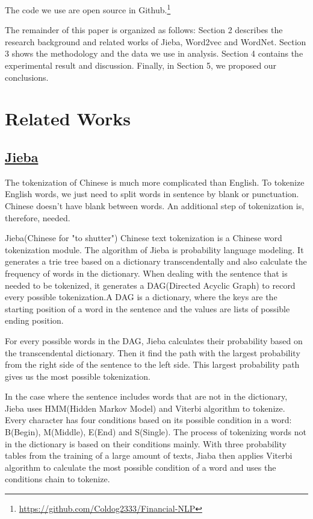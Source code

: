 \documentclass[10pt, conference, compsocconf]{IEEEtran}
\begin{document}
The code we use are open source in Github.\footnote{\href{https://github.com/Coldog2333/Financial-NLP}{https://github.com/Coldog2333/Financial-NLP}}

The remainder of this paper is organized as follows: Section 2 describes the research background and related works of Jieba, Word2vec and WordNet. Section 3 shows the methodology and the data we use in analysis. Section 4 contains the experimental result and discussion. Finally, in Section 5, we proposed our conclusions.
\vspace{0.5cm}
\section{Related Works}
\subsection{\underline{Jieba}}
The tokenization of Chinese is much more complicated than English. To tokenize English words, we just need to split words in sentence by blank or punctuation. Chinese doesn't have blank between words. An additional step of tokenization is, therefore, needed.

Jieba(Chinese for "to shutter") Chinese text tokenization is a Chinese word tokenization module. The algorithm of Jieba is probability language modeling. It generates a trie tree based on a dictionary transcendentally and also calculate the frequency of words in the dictionary. When dealing with the sentence that is needed to be tokenized, it generates a DAG(Directed Acyclic Graph) to record every possible tokenization.A DAG is a dictionary, where the keys are the starting position of a word in the sentence and the values are lists of possible ending position.

For every possible words in the DAG, Jieba calculates their probability based on the transcendental dictionary. Then it find the path with the largest probability from the right side of the sentence to the left side. This largest probability path gives us the most possible tokenization.

In the case where the sentence includes words that are not in the dictionary, Jieba uses HMM(Hidden Markov Model) and Viterbi algorithm to tokenize. Every character has four conditions based on its possible condition in a word: B(Begin), M(Middle), E(End) and S(Single). The process of tokenizing words not in the dictionary is based on their conditions mainly. With three probability tables from the training of a large amount of texts, Jiaba then applies Viterbi algorithm to calculate the most possible condition of a word and uses the conditions chain to tokenize.
\end{document}

